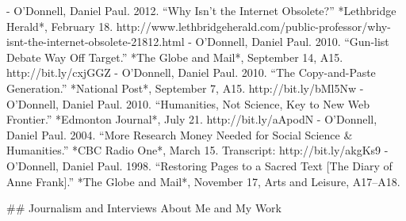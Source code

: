 - O’Donnell, Daniel Paul. 2012. “Why Isn’t the Internet Obsolete?” *Lethbridge Herald*, February 18. http:/\allowbreak{}/\allowbreak{}www.lethbridgeherald.com/\allowbreak{}public-professor/\allowbreak{}why-isnt-the-internet-obsolete-21812.html
- O’Donnell, Daniel Paul. 2010. “Gun-list Debate Way Off Target.” *The Globe and Mail*, September 14, A15. http:/\allowbreak{}/\allowbreak{}bit.ly/\allowbreak{}cxjGGZ
- O’Donnell, Daniel Paul. 2010. “The Copy-and-Paste Generation.” *National Post*, September 7, A15. http:/\allowbreak{}/\allowbreak{}bit.ly/\allowbreak{}bMl5Nw
- O’Donnell, Daniel Paul. 2010. “Humanities, Not Science, Key to New Web Frontier.” *Edmonton Journal*, July 21. http:/\allowbreak{}/\allowbreak{}bit.ly/\allowbreak{}aApodN
- O’Donnell, Daniel Paul. 2004. “More Research Money Needed for Social Science & Humanities.” *CBC Radio One*, March 15. Transcript: http:/\allowbreak{}/\allowbreak{}bit.ly/\allowbreak{}akgKs9
- O’Donnell, Daniel Paul. 1998. “Restoring Pages to a Sacred Text [The Diary of Anne Frank].” *The Globe and Mail*, November 17, Arts and Leisure, A17–A18.

\sectionbreak{}
## Journalism and Interviews About Me and My Work

